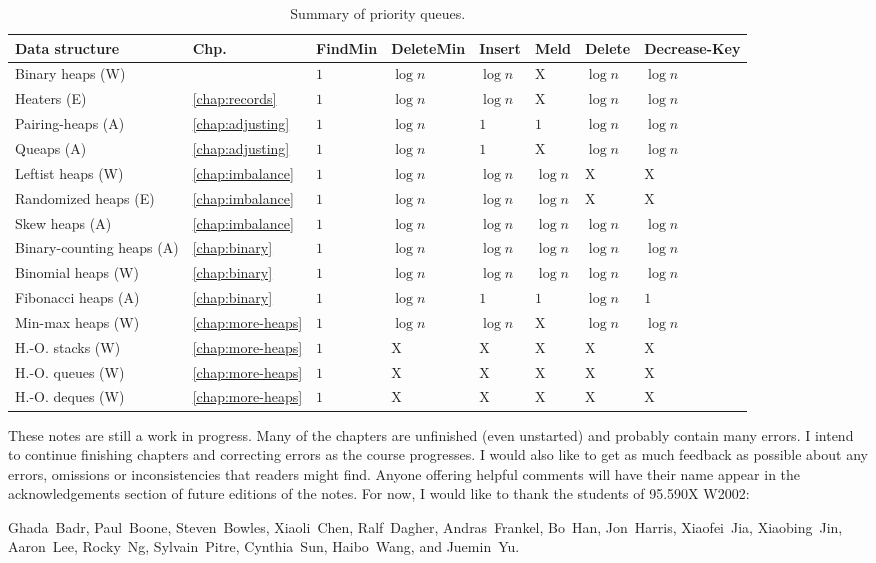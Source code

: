 \begin{table}
\begin{center}
\begin{tabular}{|l|l|l|l|l|l|l|l|}\hline
Data structure & Chp. & FindMin & DeleteMin & Insert & Meld & Delete & Decrease-Key \\ \hline\hline
Binary heaps (W) &  & $1$ & $\log n$ & $\log n$ & X & $\log n$ & $\log n$ \\
Heaters (E) & \ref{chap:records} & $1$ & $\log n$ & $\log n$ & X & $\log n$ & $\log n$ \\
Pairing-heaps (A) & \ref{chap:adjusting} & $1$ & $\log n$ & $1$ & $1$ & $\log n$ & $\log n$ \\
Queaps (A) & \ref{chap:adjusting} & $1$ & $\log n$ & $1$ & X & $\log n$ & $\log n$ \\
Leftist heaps (W) & \ref{chap:imbalance} & $1$ & $\log n$ & $\log n$ & $\log n$ & X & X \\
Randomized heaps (E) & \ref{chap:imbalance} & $1$ & $\log n$ & $\log n$ & $\log n$ & X & X \\
Skew heaps (A) & \ref{chap:imbalance} & $1$ & $\log n$ & $\log n$ & $\log n$ & $\log n$ & $\log n$ \\
Binary-counting heaps (A) & \ref{chap:binary} & $1$ & $\log n$ & $\log n$ & $\log n$ & $\log n$ & $\log n$ \\
Binomial heaps (W) & \ref{chap:binary} & $1$ & $\log n$ & $\log n$ & $\log n$ & $\log n$ & $\log n$ \\
Fibonacci heaps (A) & \ref{chap:binary}  & $1$ & $\log n$ & $1$ & $1$  & $\log n$ & $1$ \\
Min-max heaps (W) & \ref{chap:more-heaps}  & $1$ & $\log n$ & $\log n$ & X & $\log n$ & $\log n$ \\
H.-O. stacks (W) & \ref{chap:more-heaps}  & $1$ & X & X & X  & X & X \\
H.-O. queues (W) & \ref{chap:more-heaps}  & $1$ & X & X & X  & X & X \\
H.-O. deques (W) & \ref{chap:more-heaps}  & $1$ & X & X & X  & X & X \\ \hline
\end{tabular}
\end{center}
\caption{Summary of priority queues.}
\end{table}




These notes are still a work in progress. Many of the chapters are
unfinished (even unstarted) and probably contain many errors.  I
intend to continue finishing chapters and correcting errors as the
course progresses.  I would also like to get as much feedback as
possible about any errors, omissions or inconsistencies that readers
might find.  Anyone offering helpful comments will have their name
appear in the acknowledgements section of future editions of the
notes.  For now, I would like to thank the students of 95.590X W2002:

\mbox{Ghada Badr}, \mbox{Paul Boone}, \mbox{Steven Bowles},
\mbox{Xiaoli Chen}, \mbox{Ralf Dagher}, \mbox{Andras Frankel},
\mbox{Bo Han}, \mbox{Jon Harris}, \mbox{Xiaofei Jia}, \mbox{Xiaobing
Jin}, \mbox{Aaron Lee}, \mbox{Rocky Ng}, \mbox{Sylvain Pitre},
\mbox{Cynthia Sun}, \mbox{Haibo Wang}, and \mbox{Juemin Yu}.

